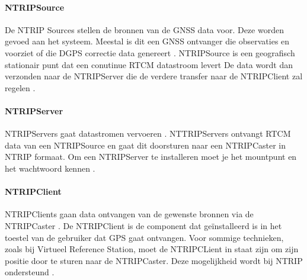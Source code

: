 \paragraph{NTRIPSource}
De NTRIP Sources stellen de bronnen van de GNSS data voor. Deze worden gevoed aan het systeem. Meestal is dit een GNSS ontvanger die observaties en voorziet of die DGPS correctie data genereert \cite{LBibNTRIP3}. NTRIPSource is een geografisch stationair punt dat een conutinue RTCM datastroom levert De data wordt dan verzonden naar de NTRIPServer die de verdere transfer naar de NTRIPClient zal regelen \cite{LBibNTRIP4}.

\paragraph{NTRIPServer}
NTRIPServers gaat datastromen vervoeren \cite{LBibGPS}. NTTRIPServers ontvangt RTCM data van een NTRIPSource en gaat dit doorsturen naar een NTRIPCaster in NTRIP formaat. Om een NTRIPServer te installeren moet je het mountpunt en het wachtwoord kennen \cite{LBibNTRIP4}.
 
\paragraph{NTRIPClient}
NTRIPClients gaan data ontvangen van de gewenste bronnen via de NTRIPCaster \cite{LBibNTRIP}. De NTRIPClient is de component dat ge\"installeerd is in het toestel van de gebruiker dat GPS gaat ontvangen. Voor sommige technieken, zoals bij Virtueel Reference Station,  moet de NTRIPCLient in staat zijn om zijn positie door te sturen naar de NTRIPCaster. Deze mogelijkheid wordt bij NTRIP ondersteund \cite{LBibNTRIP4}.



